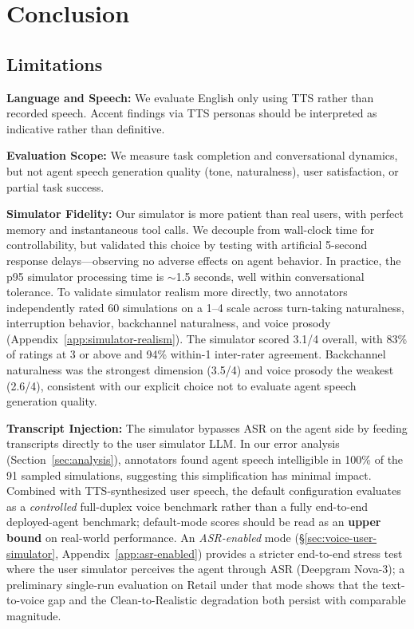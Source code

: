 \section{Conclusion}
\label{sec:conclusion}

\subsection{Limitations}

\textbf{Language and Speech:} We evaluate English only using TTS rather than recorded speech. Accent findings via TTS personas should be interpreted as indicative rather than definitive.

\textbf{Evaluation Scope:} We measure task completion and conversational dynamics, but not agent speech generation quality (tone, naturalness), user satisfaction, or partial task success.

\textbf{Simulator Fidelity:} Our simulator is more patient than real users, with perfect memory and instantaneous tool calls. We decouple from wall-clock time for controllability, but validated this choice by testing with artificial 5-second response delays---observing no adverse effects on agent behavior. In practice, the p95 simulator processing time is $\sim$1.5 seconds, well within conversational tolerance. To validate simulator realism more directly, two annotators independently rated 60 simulations on a 1--4 scale across turn-taking naturalness, interruption behavior, backchannel naturalness, and voice prosody (Appendix~\ref{app:simulator-realism}). The simulator scored 3.1/4 overall, with 83\% of ratings at 3 or above and 94\% within-1 inter-rater agreement. Backchannel naturalness was the strongest dimension (3.5/4) and voice prosody the weakest (2.6/4), consistent with our explicit choice not to evaluate agent speech generation quality.%

\textbf{Transcript Injection:} The simulator bypasses ASR on the agent side by feeding transcripts directly to the user simulator LLM. In our error analysis (Section~\ref{sec:analysis}), annotators found agent speech intelligible in 100\% of the 91 sampled simulations, suggesting this simplification has minimal impact. Combined with TTS-synthesized user speech, the default configuration evaluates \tauvoice{} as a \textit{controlled} full-duplex voice benchmark rather than a fully end-to-end deployed-agent benchmark; default-mode scores should be read as an \textbf{upper bound} on real-world performance. An \textit{ASR-enabled} mode (\S\ref{sec:voice-user-simulator}, Appendix~\ref{app:asr-enabled}) provides a stricter end-to-end stress test where the user simulator perceives the agent through ASR (Deepgram Nova-3); a preliminary single-run evaluation on Retail under that mode shows that the text-to-voice gap and the Clean-to-Realistic degradation both persist with comparable magnitude.%

